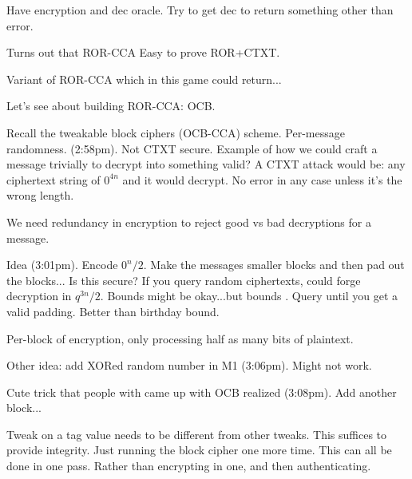 Have encryption and dec oracle. Try to get dec to return something other than error.

Turns out that ROR-CCA
Easy to prove ROR+CTXT.

Variant of ROR-CCA which in this game could return...

Let's see about building ROR-CCA: OCB.

Recall the tweakable block ciphers (OCB-CCA) scheme. Per-message randomness. (2:58pm).
Not CTXT secure.
Example of how we could craft a message trivially to decrypt into something valid? A CTXT attack would be: any ciphertext string of $0^{4n}$ and it would decrypt. No error in any case unless it's the wrong length.

We need redundancy in encryption to reject good vs bad decryptions for a message.

Idea (3:01pm). Encode $0^n / 2$. Make the messages smaller blocks and then pad out the blocks... Is this secure? If you query random ciphertexts, could forge decryption in $q^{3n} / 2$. Bounds might be okay...but bounds .
Query until you get a valid padding. Better than birthday bound.

Per-block of encryption, only processing half as many bits of plaintext.

Other idea: add XORed random number in M1 (3:06pm). Might not work.

Cute trick that people with came up with OCB realized (3:08pm). Add another block...

Tweak on a tag value needs to be different from other tweaks. This suffices to provide integrity. Just running the block cipher one more time. This can all be done in one pass. Rather than encrypting in one, and then authenticating.